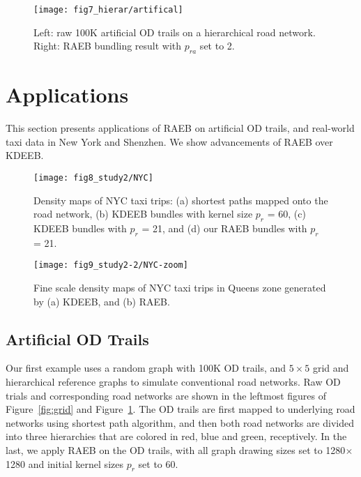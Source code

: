 \begin{figure}[t]
	\centering
	\texttt{[image: fig7\_hierar/artifical]}
	\vspace{-6mm}
	\caption{
		Left: raw 100K artificial OD trails on a hierarchical road network.
		Right: RAEB bundling result with $p_{ra}$ set to 2.
		}
	\label{fig:hier}
	\vspace{-5mm}
\end{figure}

\section{Applications}
This section presents applications of RAEB on artificial OD trails, and real-world taxi data in New York and Shenzhen.
We show advancements of RAEB over KDEEB.

\begin{figure*}[t]
	\centering
	\texttt{[image: fig8\_study2/NYC]}
	\vspace{-2mm}
	\caption{Density maps of NYC taxi trips:
	(a) shortest paths mapped onto the road network, 
	(b) KDEEB bundles with kernel size $p_r$ = 60,
	(c) KDEEB bundles with $p_r$ = 21,
	and (d) our RAEB bundles with $p_r$ = 21.}
	\label{fig:nyc_visual}
	\vspace{-4mm}
\end{figure*}

\begin{figure}[t]
	\centering
	\texttt{[image: fig9\_study2-2/NYC-zoom]}
	\vspace{-3mm}
	\caption{Fine scale density maps of NYC taxi trips in Queens zone generated by (a) KDEEB, and (b) RAEB.}
	\label{fig:nyc-zoom}
	\vspace{-4mm}
\end{figure}

\subsection{Artificial OD Trails}
\label{ssec:study1}

Our first example uses a random graph with 100K OD trails, and $5 \times 5$ grid and hierarchical reference graphs to simulate conventional road networks.
Raw OD trials and corresponding road networks are shown in the leftmost figures of Figure~\ref{fig:grid} and Figure~\ref{fig:hier}.
The OD trails are first mapped to underlying road networks using shortest path algorithm, and then both road networks are divided into three hierarchies that are colored in red, blue and green, receptively.
In the last, we apply RAEB on the OD trails, with all graph drawing sizes set to 1280$\times$1280 and initial kernel sizes $p_r$ set to 60.

